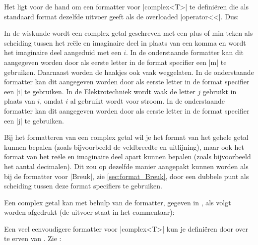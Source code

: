 \begin{cpplstShortInline}
Het ligt voor de hand om een formatter voor |complex<T>| te definiëren die als standaard format dezelfde uitvoer geeft als de overloaded |operator<<|.
Dus:

In de wiskunde wordt een complex getal geschreven met een plus of min teken als scheiding tussen het reële en imaginaire deel in plaats van een komma en wordt het imaginaire deel aangeduid met een $i$.
In de onderstaande formatter kan dit aangegeven worden door als eerste letter in de format specifier een |m| te gebruiken.
Daarnaast worden de haakjes ook vaak weggelaten.
In de onderstaande formatter kan dit aangegeven worden door als eerste letter in de format specifier een |i| te gebruiken.
In de Elektrotechniek wordt vaak de letter $j$ gebruikt in plaats van $i$, omdat $i$ al gebruikt wordt voor stroom.
In de onderstaande formatter kan dit aangegeven worden door als eerste letter in de format specifier een |j| te gebruiken.

Bij het formatteren van een complex getal wil je het format van het gehele getal kunnen bepalen (zoals bijvoorbeeld de veldbreedte en uitlijning), maar ook het format van het reële en imaginaire deel apart kunnen bepalen (zoals bijvoorbeeld het aantal decimalen).
Dit zou op dezelfde manier aangepakt kunnen worden als bij de formatter voor |Breuk|, zie \cref{sec:format_Breuk}, door een dubbele punt als scheiding tussen deze format specifiers te gebruiken.

Een complex getal kan met behulp van de formatter, gegeven in , als volgt worden afgedrukt (de uitvoer staat in het commentaar):

Een veel eenvoudigere formatter voor |complex<T>| kun je definiëren door over te erven van . Zie :


\end{cpplstShortInline}
